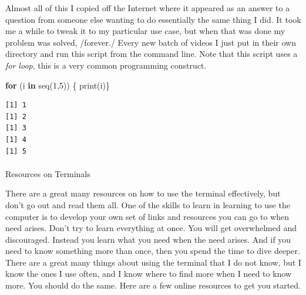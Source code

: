 \documentclass[
  letterpaper,
  DIV=11,
  numbers=noendperiod]{scrreprt}
\makeatletter
\let\oldparagraph\paragraph
\renewcommand{\paragraph}{
    \@ifstar
      \xxxParagraphStar
      \xxxParagraphNoStar
  }
\newcommand{\xxxParagraphStar}[1]{\oldparagraph*{#1}\mbox{}}
\newcommand{\xxxParagraphNoStar}[1]{\oldparagraph{#1}\mbox{}}
\newenvironment{Shaded}{\begin{snugshade}}{\end{snugshade}}
\newcommand{\AttributeTok}[1]{\textcolor[rgb]{0.40,0.45,0.13}{#1}}
\newcommand{\BuiltInTok}[1]{\textcolor[rgb]{0.00,0.23,0.31}{#1}}
\newcommand{\ControlFlowTok}[1]{\textcolor[rgb]{0.00,0.23,0.31}{\textbf{#1}}}
\newcommand{\DecValTok}[1]{\textcolor[rgb]{0.68,0.00,0.00}{#1}}
\newcommand{\ExtensionTok}[1]{\textcolor[rgb]{0.00,0.23,0.31}{#1}}
\newcommand{\FunctionTok}[1]{\textcolor[rgb]{0.28,0.35,0.67}{#1}}
\newcommand{\KeywordTok}[1]{\textcolor[rgb]{0.00,0.23,0.31}{\textbf{#1}}}
\newcommand{\NormalTok}[1]{\textcolor[rgb]{0.00,0.23,0.31}{#1}}
\newcommand{\OperatorTok}[1]{\textcolor[rgb]{0.37,0.37,0.37}{#1}}
\newcommand{\PreprocessorTok}[1]{\textcolor[rgb]{0.68,0.00,0.00}{#1}}
\newcommand{\StringTok}[1]{\textcolor[rgb]{0.13,0.47,0.30}{#1}}
\newcommand{\VariableTok}[1]{\textcolor[rgb]{0.07,0.07,0.07}{#1}}
\makeatother
\begin{document}
\begin{Shaded}
\end{Shaded}

Almost all of this I copied off the Internet where it appeared as an
answer to a question from someone else wanting to do essentially the
same thing I did. It took me a while to tweak it to my particular use
case, but when that was done my problem was solved, /forever./ Every new
batch of videos I just put in their own directory and run this script
from the command line. Note that this script uses a \emph{for loop},
this is a very common programming construct.

\begin{Shaded}
\begin{Highlighting}[]
\ControlFlowTok{for}\NormalTok{ (i }\ControlFlowTok{in} \FunctionTok{seq}\NormalTok{(}\DecValTok{1}\NormalTok{,}\DecValTok{5}\NormalTok{)) \{ }\FunctionTok{print}\NormalTok{(i)\}}
\end{Highlighting}
\end{Shaded}

\begin{verbatim}
[1] 1
[1] 2
[1] 3
[1] 4
[1] 5
\end{verbatim}

\paragraph{Resources on Terminals}\label{resources-on-terminals}

There are a great many resources on how to use the terminal effectively,
but don't go out and read them all. One of the skills to learn in
learning to use the computer is to develop your own set of links and
resources you can go to when need arises. Don't try to learn everything
at once. You will get overwhelmed and discouraged. Instead you learn
what you need when the need arises. And if you need to know something
more than once, then you spend the time to dive deeper. There are a
great many things about using the terminal that I do not know, but I
know the ones I use often, and I know where to find more when I need to
know more. You should do the same. Here are a few online resources to
get you started.
\end{document}
